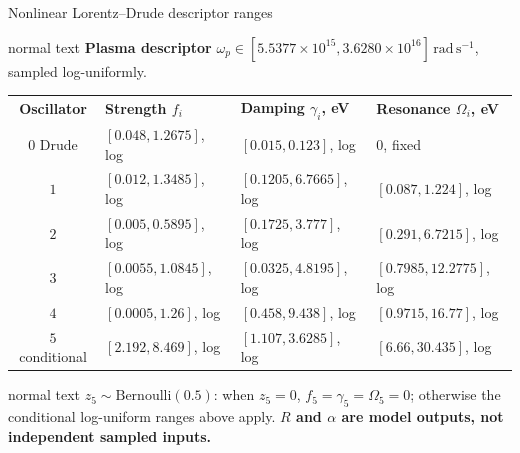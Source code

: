 \documentclass[aspectratio=169,10pt]{beamer}
\begin{document}
\begin{frame}[t]{Nonlinear Lorentz--Drude descriptor ranges}
  \hypertarget{supp:sampling-nonlinear-optics}{}
  \vspace{-0.18cm}\hfill
  \hspace{0.10cm}\GVBackupIndexButton
  \vspace{0.01cm}
  \begin{beamercolorbox}[wd=0.92\textwidth,sep=0.42em]{normal text}
    \small\textbf{\color{GVTeal}Plasma descriptor}\quad
    \(\omega_p\in[5.5377\times10^{15},3.6280\times10^{16}]\,\mathrm{rad\,s^{-1}}\), sampled log-uniformly.
  \end{beamercolorbox}
  \vspace{0.10cm}
  \begin{center}
    \scriptsize\renewcommand{\arraystretch}{1.16}
    \begin{tabular}{@{}clll@{}}
      \rowcolor{GVTealTint}
      \textbf{Oscillator} & \textbf{Strength \(f_i\)} & \textbf{Damping \(\gamma_i\), eV} & \textbf{Resonance \(\Omega_i\), eV} \\
      \(0\) Drude & \([0.048,1.2675]\), log & \([0.015,0.123]\), log & \(0\), fixed \\
      \(1\) & \([0.012,1.3485]\), log & \([0.1205,6.7665]\), log & \([0.087,1.224]\), log \\
      \(2\) & \([0.005,0.5895]\), log & \([0.1725,3.777]\), log & \([0.291,6.7215]\), log \\
      \(3\) & \([0.0055,1.0845]\), log & \([0.0325,4.8195]\), log & \([0.7985,12.2775]\), log \\
      \(4\) & \([0.0005,1.26]\), log & \([0.458,9.438]\), log & \([0.9715,16.77]\), log \\
      \(5\) conditional & \([2.192,8.469]\), log & \([1.107,3.6285]\), log & \([6.66,30.435]\), log \\
    \end{tabular}
  \end{center}
  \vspace{0.06cm}
  \begin{beamercolorbox}[wd=0.92\textwidth,sep=0.48em]{normal text}
    \scriptsize
    \(z_5\sim\mathrm{Bernoulli}(0.5)\): when \(z_5=0\), \(f_5=\gamma_5=\Omega_5=0\); otherwise the conditional log-uniform ranges above apply. \textbf{\(R\) and \(\alpha\) are model outputs, not independent sampled inputs.}
  \end{beamercolorbox}
\end{frame}
\end{document}
